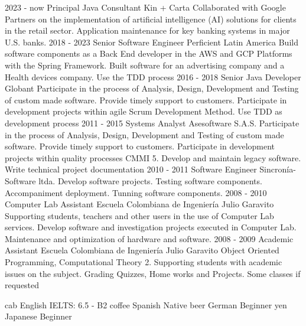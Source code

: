 \documentclass[icon]{twentysecondcv}
\begin{document}
\begin{twenty}
\twentyitem
    {2023 - now}
    {Principal Java Consultant}
    {Kin + Carta}
    {Collaborated with Google Partners on the implementation of artificial intelligence (AI) solutions for clients in the retail sector. Application maintenance for key banking systems in major U.S. banks. }
\twentyitem
    {2018 - 2023}
    {Senior Software Engineer}
    {Perficient Latin America}
    {Build software components as a Back End developer in the AWS and GCP Platforms with the Spring Framework. Built software for an advertising company and a Health devices company. Use the TDD process}
\twentyitem
    {2016 - 2018}
    {Senior Java Developer}
    {Globant}
    {Participate in the process of Analysis, Design, Development and Testing of custom made software. Provide timely support to customers. Participate in development projects within agile Scrum Development Method. Use TDD as development process}
  \twentyitem
    {2011 - 2015}
    {Systems Analyst}
    {Asesoftware S.A.S.}
    {Participate in the process of Analysis, Design, Development and Testing of custom made software. Provide timely support to customers. Participate in development projects within quality processes CMMI 5. Develop and maintain legacy software. Write technical project documentation}
  \twentyitem
    {2010 - 2011}
    {Software Engineer}
    {Sincron\'ia-Software ltda.}
    {Develop software projects. Testing software components. Accompaniment deployment. Tunning software components.}
\twentyitem
    {2008 - 2010}
    {Computer Lab Assistant}
    {Escuela Colombiana de Ingenier\'ia  Julio Garavito}
    {Supporting students, teachers and other users in the use of Computer Lab services. Develop software and investigation projects executed in Computer Lab. Maintenance and optimization of hardware and software.}
\twentyitem
    {2008 - 2009}
    {Academic Assistant}
    {Escuela Colombiana de Ingenier\'ia  Julio Garavito}
    {Object Oriented Programming, Computational Theory 2. Supporting students with academic issues on the subject. Grading Quizzes, Home works and Projects. Some classes if requested}

\end{twenty}


\begin{twentyshorticon}
  \twentyitemshorticon
    {cab}
    {English}
    {IELTS: 6.5 - B2}
  \twentyitemshorticon
    {coffee}
    {Spanish}
    {Native}
  \twentyitemshorticon
    {beer}
    {German}
    {Beginner}
  \twentyitemshorticon
    {yen}
    {Japanese}
    {Beginner}
\end{twentyshorticon}


\end{document}
